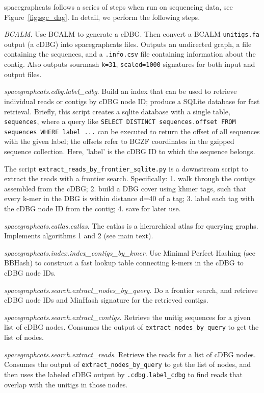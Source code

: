 \textsf{spacegraphcats} follows a series of steps when run on sequencing
data, see Figure~\ref{fig:sgc_dag}. In detail, we perform the following
steps.

\emph{BCALM}. Use BCALM to generate a cDBG. Then convert a BCALM {\tt unitigs.fa}
output (a cDBG) into spacegraphcats files.
Outputs an undirected graph, a file containing the sequences, and a
{\tt .info.csv} file containing information about the contig. Also outputs 
sourmash {\tt k=31}, {\tt scaled=1000} signatures for both input and
output files.

\emph{spacegraphcats.cdbg.label\_cdbg}. Build an index that can be
used to retrieve individual reads or contigs by cDBG node ID; produce 
a SQLite database for fast retrieval. Briefly, this script creates a 
sqlite database with a single table, {\tt sequences}, where a query like
{\tt SELECT DISTINCT sequences.offset FROM sequences WHERE label ...}
can be executed to return the offset of all sequences with the given
label; the offsets refer to BGZF coordinates in the gzipped sequence collection. Here, 'label' is the cDBG ID to which the sequence belongs.

The script {\tt extract\_reads\_by\_frontier\_sqlite.py} is a downstream script to
extract the reads with a frontier search.
Specifically: 1. walk through the contigs assembled from the cDBG;  
2. build a DBG cover using khmer tags, such that every k-mer in the DBG is 
within distance d=40 of a tag;  3. label each tag with the cDBG node ID 
from the contig; 4. save for later use.

\emph{spacegraphcats.catlas.catlas}. The catlas is a hierarchical 
atlas for querying graphs. Implements algorithms 1 and 2 (see main text).

\emph{spacegraphcats.index.index\_contigs\_by\_kmer}. Use Minimal Perfect 
Hashing (see BBHash) to construct a fast lookup table connecting k-mers 
in the cDBG to cDBG node IDs.

\emph{spacegraphcats.search.extract\_nodes\_by\_query}. Do a frontier 
search, and retrieve cDBG node IDs and MinHash signature for the retrieved 
contigs.

\emph{spacegraphcats.search.extract\_contigs}. Retrieve the unitig sequences 
for a given list of cDBG nodes.  Consumes the output of {\tt extract\_nodes\_by\_query} 
to get the list of nodes.

\emph{spacegraphcats.search.extract\_reads}. Retrieve the reads for a list of cDBG 
nodes.  Consumes the output of {\tt extract\_nodes\_by\_query} to get the list of 
nodes, and then uses the labeled cDBG output by {\tt .cdbg.label\_cdbg} to 
find reads that overlap with the unitigs in those nodes.
  

